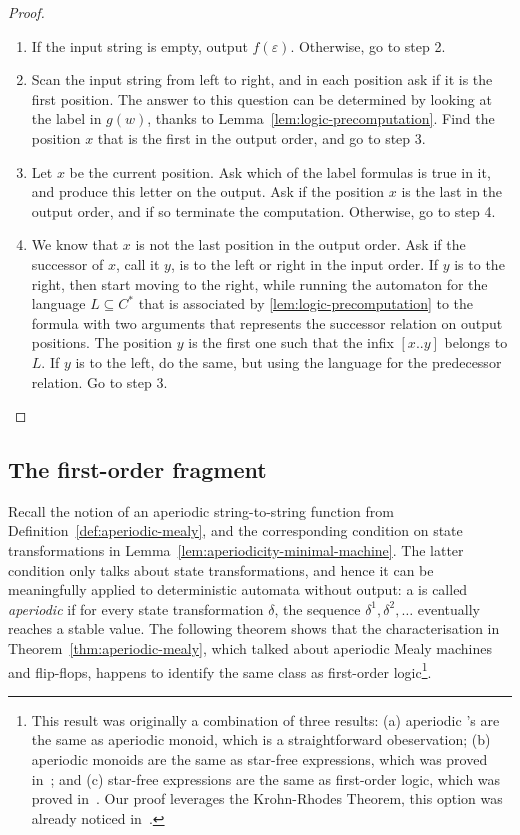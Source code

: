 \begin{proof}
    \begin{enumerate}
        \item If the input string is empty, output $f(\varepsilon)$. Otherwise, go to step 2.
        \item Scan the input string from left to right, and in each position ask if it is the first position. The answer to this question can be determined by looking at the label in $g(w)$, thanks to Lemma~\ref{lem:logic-precomputation}. Find the position $x$ that is the first in the output order, and go to step 3.
        \item Let $x$ be the current position. Ask which of the label formulas is true in it, and produce this letter on the output. Ask if the position $x$ is the last in the output order, and if so terminate the computation. Otherwise, go to step 4.
        \item We know that $x$ is not the last position in the output order. Ask if the successor of $x$, call it $y$, is to the left or right in the input order. If $y$ is to the right, then start moving to the right, while running the automaton for the language $L \subseteq C^*$ that is associated  by \cref{lem:logic-precomputation} to the formula with two arguments that represents the successor relation on output positions. The position $y$ is the first one such that the infix $[x..y]$ belongs to $L$. If $y$ is to the left, do the same, but using the language  for the predecessor relation. Go to step 3. 
    \end{enumerate}

    
\end{proof}


\subsection{The first-order fragment}
\label{sec:logic-aperiodic}
\newcommand{\fotype}{\text{tp}}


Recall the notion of an aperiodic string-to-string function from Definition~\ref{def:aperiodic-mealy}, and the corresponding condition on state transformations in Lemma~\ref{lem:aperiodicity-minimal-machine}. The latter condition only talks about state transformations, and hence it  can be meaningfully applied to deterministic automata without output:  a \dfa is called \emph{aperiodic} if for every state transformation $\delta$, the sequence $\delta^1, \delta^2, \ldots$ eventually reaches a stable value. The following theorem shows that the characterisation in Theorem~\ref{thm:aperiodic-mealy}, which talked about aperiodic Mealy machines and flip-flops, happens to identify the same class as first-order logic\footnote{This result was originally a combination of three results: (a) aperiodic \dfa's are the same as aperiodic monoid, which is a straightforward obeservation; (b) aperiodic monoids are the same as star-free expressions, which was proved in~\cite[Main Property]{Schutzenberger1965}; and (c) star-free expressions are the same as first-order logic, which was proved in~\cite[Theorem 10.5]{McNaughtonPapert1971}. Our proof leverages the Krohn-Rhodes Theorem, this option was already noticed in~\cite[Footnote 1]{meyer1969}.}. 

